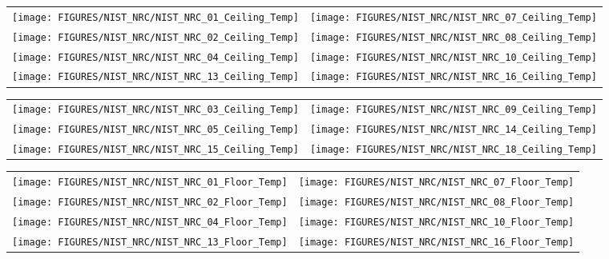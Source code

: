 \begin{figure}[p]
\begin{tabular*}{\textwidth}{l@{\extracolsep{\fill}}r}
\texttt{[image: FIGURES/NIST\_NRC/NIST\_NRC\_01\_Ceiling\_Temp]} &
\texttt{[image: FIGURES/NIST\_NRC/NIST\_NRC\_07\_Ceiling\_Temp]} \\
\texttt{[image: FIGURES/NIST\_NRC/NIST\_NRC\_02\_Ceiling\_Temp]} &
\texttt{[image: FIGURES/NIST\_NRC/NIST\_NRC\_08\_Ceiling\_Temp]} \\
\texttt{[image: FIGURES/NIST\_NRC/NIST\_NRC\_04\_Ceiling\_Temp]} &
\texttt{[image: FIGURES/NIST\_NRC/NIST\_NRC\_10\_Ceiling\_Temp]} \\
\texttt{[image: FIGURES/NIST\_NRC/NIST\_NRC\_13\_Ceiling\_Temp]} &
\texttt{[image: FIGURES/NIST\_NRC/NIST\_NRC\_16\_Ceiling\_Temp]}
\end{tabular*}
\label{NIST_NRC_Ceiling_Temp_Closed}
\end{figure}

\begin{figure}[p]
\begin{tabular*}{\textwidth}{l@{\extracolsep{\fill}}r}
\texttt{[image: FIGURES/NIST\_NRC/NIST\_NRC\_03\_Ceiling\_Temp]} &
\texttt{[image: FIGURES/NIST\_NRC/NIST\_NRC\_09\_Ceiling\_Temp]} \\
\texttt{[image: FIGURES/NIST\_NRC/NIST\_NRC\_05\_Ceiling\_Temp]} &
\texttt{[image: FIGURES/NIST\_NRC/NIST\_NRC\_14\_Ceiling\_Temp]} \\
\texttt{[image: FIGURES/NIST\_NRC/NIST\_NRC\_15\_Ceiling\_Temp]} &
\texttt{[image: FIGURES/NIST\_NRC/NIST\_NRC\_18\_Ceiling\_Temp]}
\end{tabular*}
\label{NIST_NRC_Ceiling_Temp_Open}
\end{figure}

\begin{figure}[p]
\begin{tabular*}{\textwidth}{l@{\extracolsep{\fill}}r}
\texttt{[image: FIGURES/NIST\_NRC/NIST\_NRC\_01\_Floor\_Temp]} &
\texttt{[image: FIGURES/NIST\_NRC/NIST\_NRC\_07\_Floor\_Temp]} \\
\texttt{[image: FIGURES/NIST\_NRC/NIST\_NRC\_02\_Floor\_Temp]} &
\texttt{[image: FIGURES/NIST\_NRC/NIST\_NRC\_08\_Floor\_Temp]} \\
\texttt{[image: FIGURES/NIST\_NRC/NIST\_NRC\_04\_Floor\_Temp]} &
\texttt{[image: FIGURES/NIST\_NRC/NIST\_NRC\_10\_Floor\_Temp]} \\
\texttt{[image: FIGURES/NIST\_NRC/NIST\_NRC\_13\_Floor\_Temp]} &
\texttt{[image: FIGURES/NIST\_NRC/NIST\_NRC\_16\_Floor\_Temp]}
\end{tabular*}
\label{NIST_NRC_Floor_Temp_Closed}
\end{figure}

